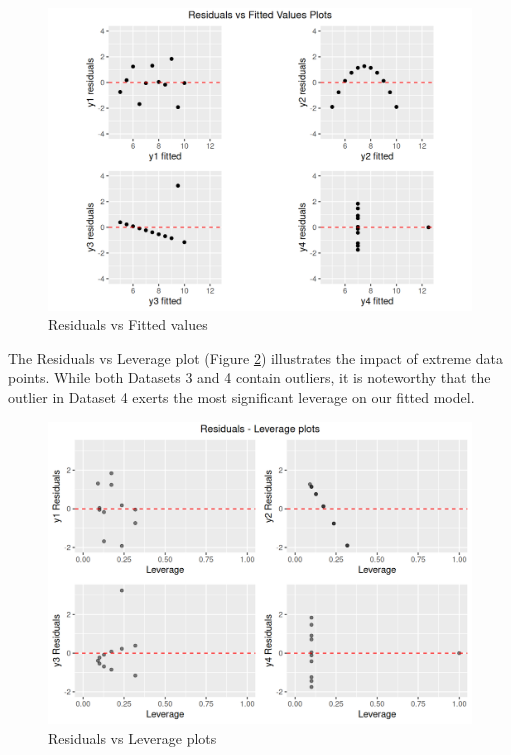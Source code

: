 \documentclass[12pt]{article}
\begin{document}
\begin{figure}[htbp]
\includegraphics[width=.7\textwidth]{RVF.png}
\centering
\caption{Residuals vs Fitted values}
\label{Fig:RVF}
\end{figure}

The Residuals vs Leverage plot (Figure \ref{Fig:RVL}) illustrates the impact of extreme data points. While both Datasets 3 and 4 contain outliers, it is noteworthy that the outlier in Dataset 4 exerts the most significant leverage on our fitted model.

\begin{figure}[htbp]
\includegraphics[width=.7\textwidth]{RVL.png}
\centering
\caption{Residuals vs Leverage plots}
\label{Fig:RVL}
\end{figure}



	
\end{document}
